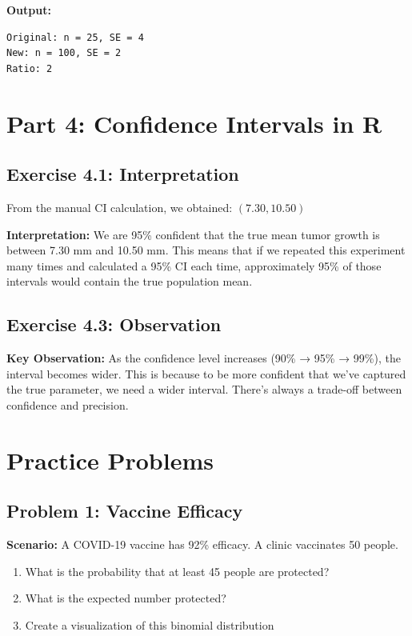 \documentclass[11pt]{article}
\begin{document}
\begin{routput}
\textbf{Output:}
\begin{verbatim}
Original: n = 25, SE = 4
New: n = 100, SE = 2
Ratio: 2
\end{verbatim}
\end{routput}

\section{Part 4: Confidence Intervals in R}

\subsection{Exercise 4.1: Interpretation}

From the manual CI calculation, we obtained: $(7.30, 10.50)$

\textcolor{correctgreen}{\textbf{Interpretation:}} We are 95\% confident that the true mean tumor growth is between 7.30 mm and 10.50 mm. This means that if we repeated this experiment many times and calculated a 95\% CI each time, approximately 95\% of those intervals would contain the true population mean.

\subsection{Exercise 4.3: Observation}

\textcolor{correctgreen}{\textbf{Key Observation:}} As the confidence level increases (90\% → 95\% → 99\%), the interval becomes wider. This is because to be more confident that we've captured the true parameter, we need a wider interval. There's always a trade-off between confidence and precision.

\section{Practice Problems}

\subsection{Problem 1: Vaccine Efficacy}

\textbf{Scenario:} A COVID-19 vaccine has 92\% efficacy. A clinic vaccinates 50 people.

\begin{enumerate}[label=\alph*)]
\item What is the probability that at least 45 people are protected?
\item What is the expected number protected?
\item Create a visualization of this binomial distribution
\end{enumerate}
\end{document}
